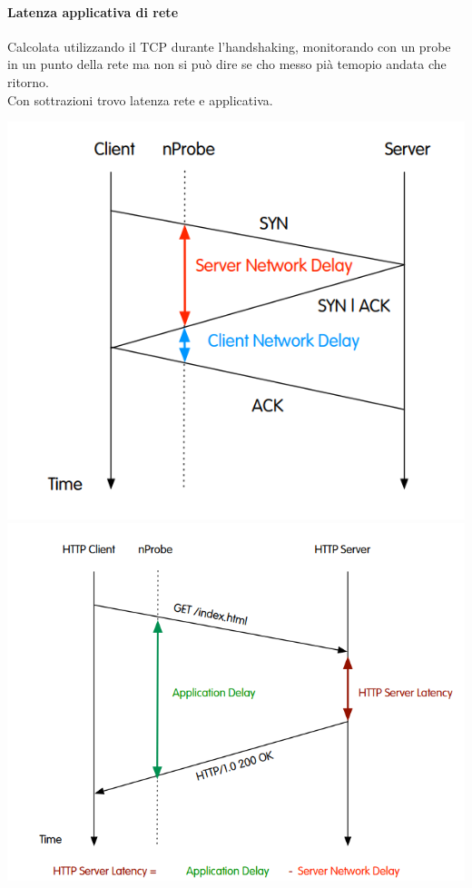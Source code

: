 \documentclass[10pt]{book}
\begin{document}
\paragraph{Latenza applicativa di rete} Calcolata utilizzando il TCP durante l'handshaking, monitorando con un probe in un punto della rete ma non si può dire se cho messo pià temopio andata che ritorno.\\
Con sottrazioni trovo latenza rete e applicativa.
\begin{multicols}{2}
	\includegraphics[scale=0.5]{latency1.png}\\
	\includegraphics[scale=0.5]{latency2.png}
\end{multicols}
\end{document}

